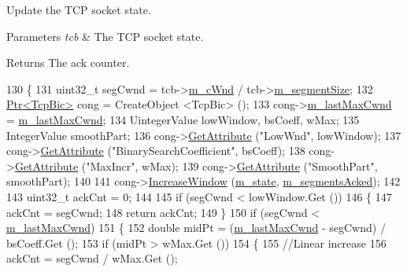 Update the T\+CP socket state. 


\begin{DoxyParams}{Parameters}
{\em tcb} & The T\+CP socket state. \\
\hline
\end{DoxyParams}
\begin{DoxyReturn}{Returns}
The ack counter. 
\end{DoxyReturn}

\begin{DoxyCode}
130 \{
131   uint32\_t segCwnd = tcb->\hyperlink{classns3_1_1TcpSocketState_a7cd3d2156a483c1db436097477a0fd7f}{m\_cWnd} / tcb->\hyperlink{classns3_1_1TcpSocketState_a079872f7b0099ef5f3cab4ff47bd2edd}{m\_segmentSize};
132   \hyperlink{classns3_1_1Ptr}{Ptr<TcpBic>} cong = CreateObject <TcpBic> ();
133   cong->\hyperlink{classns3_1_1TcpBic_a082025c05e83dcddab77a6e3209cd4eb}{m\_lastMaxCwnd} = \hyperlink{classTcpBicIncrementTest_abc6cf3f641221e276bd5eb67975b1037}{m\_lastMaxCwnd};
134   UintegerValue lowWindow, bsCoeff, wMax;
135   IntegerValue smoothPart;
136   cong->\hyperlink{classns3_1_1ObjectBase_a895d1de2f96063d0e0fd78463e7a7e30}{GetAttribute} (\textcolor{stringliteral}{"LowWnd"}, lowWindow);
137   cong->\hyperlink{classns3_1_1ObjectBase_a895d1de2f96063d0e0fd78463e7a7e30}{GetAttribute} (\textcolor{stringliteral}{"BinarySearchCoefficient"}, bsCoeff);
138   cong->\hyperlink{classns3_1_1ObjectBase_a895d1de2f96063d0e0fd78463e7a7e30}{GetAttribute} (\textcolor{stringliteral}{"MaxIncr"}, wMax);
139   cong->\hyperlink{classns3_1_1ObjectBase_a895d1de2f96063d0e0fd78463e7a7e30}{GetAttribute} (\textcolor{stringliteral}{"SmoothPart"}, smoothPart);
140 
141   cong->\hyperlink{classns3_1_1TcpBic_a9dbe81be07cbfc1cd16af03deb9ccc34}{IncreaseWindow} (\hyperlink{classTcpBicIncrementTest_ad536c9ce669c8e9a264f8ac4c8937f7f}{m\_state}, \hyperlink{classTcpBicIncrementTest_ad246654ee463b2af9db44089f4d2f1c9}{m\_segmentsAcked});
142 
143   uint32\_t ackCnt = 0;
144 
145   \textcolor{keywordflow}{if} (segCwnd < lowWindow.Get ())
146     \{
147       ackCnt = segCwnd;
148       \textcolor{keywordflow}{return} ackCnt;
149     \}
150   \textcolor{keywordflow}{if} (segCwnd < \hyperlink{classTcpBicIncrementTest_abc6cf3f641221e276bd5eb67975b1037}{m\_lastMaxCwnd})
151     \{
152       \textcolor{keywordtype}{double} midPt = (\hyperlink{classTcpBicIncrementTest_abc6cf3f641221e276bd5eb67975b1037}{m\_lastMaxCwnd} - segCwnd) / bsCoeff.Get ();
153       \textcolor{keywordflow}{if} (midPt > wMax.Get ())
154         \{
155           \textcolor{comment}{//Linear increase}
156           ackCnt = segCwnd / wMax.Get ();

\end{DoxyCode}
